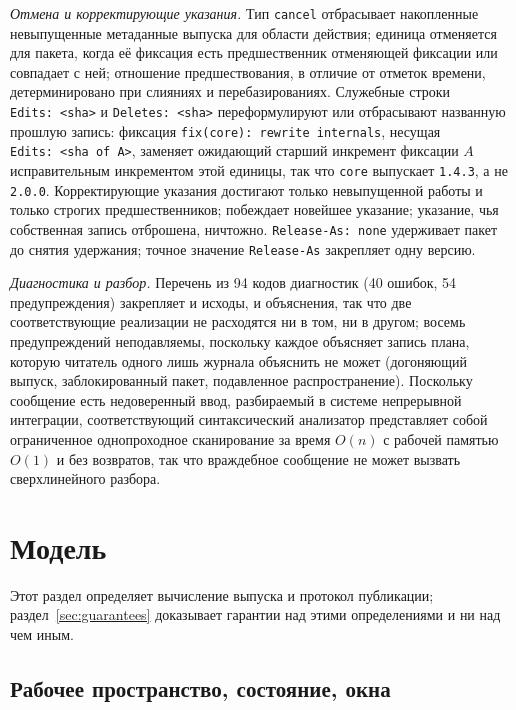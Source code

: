 \documentclass[sigconf,nonacm]{acmart}
\theoremstyle{acmplain}
\theoremstyle{acmdefinition}
\theoremstyle{acmplain}
\newcommand{\code}[1]{\texttt{#1}}
\begin{document}
\emph{Отмена и корректирующие указания.} Тип \code{cancel} отбрасывает
накопленные невыпущенные метаданные выпуска для области действия;
единица отменяется для пакета, когда её фиксация есть предшественник
отменяющей фиксации или совпадает с ней; отношение предшествования, в
отличие от отметок времени, детерминировано при слияниях и
перебазированиях. Служебные строки \code{Edits:~<sha>} и
\code{Deletes:~<sha>} переформулируют или отбрасывают названную прошлую
запись: фиксация \code{fix(core):~rewrite internals}, несущая
\code{Edits:~<sha of A>}, заменяет ожидающий старший инкремент фиксации
$A$ исправительным инкрементом этой единицы, так что \code{core}
выпускает \code{1.4.3}, а не \code{2.0.0}. Корректирующие указания
достигают только невыпущенной работы и только строгих предшественников;
побеждает новейшее указание; указание, чья собственная запись отброшена,
ничтожно. \code{Release-As:~none} удерживает пакет до снятия удержания;
точное значение \code{Release-As} закрепляет одну версию.

\emph{Диагностика и разбор.} Перечень из 94 кодов диагностик (40 ошибок,
54 предупреждения) закрепляет и исходы, и объяснения, так что две
соответствующие реализации не расходятся ни в том, ни в другом; восемь
предупреждений неподавляемы, поскольку каждое объясняет запись плана,
которую читатель одного лишь журнала объяснить не может (догоняющий
выпуск, заблокированный пакет, подавленное распространение). Поскольку
сообщение есть недоверенный ввод, разбираемый в системе непрерывной
интеграции, соответствующий синтаксический анализатор представляет
собой ограниченное однопроходное сканирование за время $O(n)$ с рабочей
памятью $O(1)$ и без возвратов, так что враждебное сообщение не может
вызвать сверхлинейного разбора.
\section{Модель}
\label{sec:model}

Этот раздел определяет вычисление выпуска и протокол публикации;
раздел~\ref{sec:guarantees} доказывает гарантии над этими
определениями и ни над чем иным.

\subsection{Рабочее пространство, состояние, окна}
\end{document}
